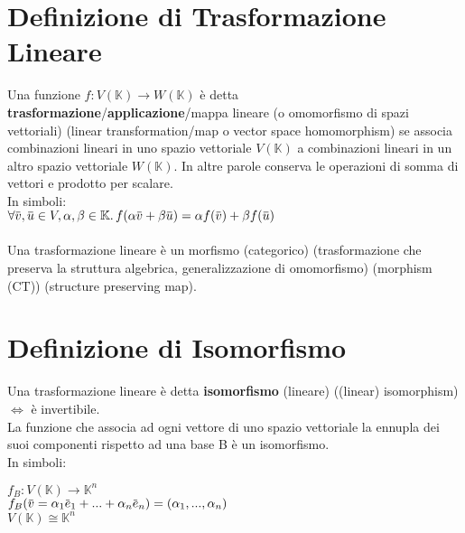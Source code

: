 \documentclass[a4paper, twoside, italian, 11pt]{book}
\newcommand{\overbar}[1] {\mkern 1.5mu\overline{\mkern-1.5mu#1\mkern-1.5mu}\mkern 1.5mu}
\newcommand{\K}{\mathbb K}
\begin{document}



\section{Definizione di Trasformazione Lineare}

Una funzione $f : V(\K) \rightarrow W(\K)$ è detta \textbf{trasformazione}/\textbf{applicazione}/mappa lineare (o omomorfismo di spazi vettoriali) (linear transformation/map o vector space homomorphism) se associa combinazioni lineari in uno spazio vettoriale $V(\K)$ a combinazioni lineari in un altro spazio vettoriale $W(\K)$. In altre parole conserva le operazioni di somma di vettori e prodotto per scalare. \\

\noindent
In simboli: \\

$\forall \overbar v, \overbar u \in V, \alpha, \beta \in \K \ldotp f(\alpha \overbar v + \beta \overbar u) = \alpha f(\overbar v) + \beta f(\overbar u)$ \\\\

\noindent
Una trasformazione lineare è un morfismo (categorico) (trasformazione che preserva la struttura algebrica, generalizzazione di omomorfismo) (morphism (CT)) (structure preserving map).



\section{Definizione di Isomorfismo}

Una trasformazione lineare è detta \textbf{isomorfismo} (lineare) ((linear) isomorphism) $\iff$ è invertibile. \\

\noindent
La funzione che associa ad ogni vettore di uno spazio vettoriale la ennupla dei suoi componenti rispetto ad una base B è un isomorfismo. \\

\noindent
In simboli:

$f_B : V(\K) \rightarrow \K^n$ \\
\indent
$f_B(\overbar v = \alpha_1 \overbar e_1 + ... + \alpha_n \overbar e_n) = (\alpha_1, ..., \alpha_n)$ \\

$V(\K) \cong \K^n$ \\
\end{document}
